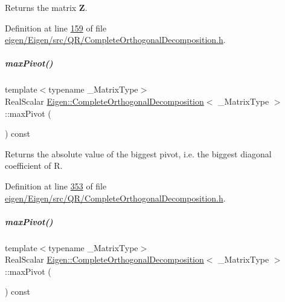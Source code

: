 \begin{DoxyReturn}{Returns}
the matrix {\bfseries Z}. 
\end{DoxyReturn}


Definition at line \hyperlink{eigen_2_eigen_2src_2_q_r_2_complete_orthogonal_decomposition_8h_source_l00159}{159} of file \hyperlink{eigen_2_eigen_2src_2_q_r_2_complete_orthogonal_decomposition_8h_source}{eigen/\+Eigen/src/\+Q\+R/\+Complete\+Orthogonal\+Decomposition.\+h}.

\mbox{\label{group___q_r___module_a5b712a58c13b7e5089be9228ec42f738}} 
\subparagraph{\texorpdfstring{max\+Pivot()}{maxPivot()}\hspace{0.1cm}{\footnotesize\ttfamily [1/2]}}
{\footnotesize\ttfamily template$<$typename \+\_\+\+Matrix\+Type$>$ \\
Real\+Scalar \hyperlink{group___q_r___module_class_eigen_1_1_complete_orthogonal_decomposition}{Eigen\+::\+Complete\+Orthogonal\+Decomposition}$<$ \+\_\+\+Matrix\+Type $>$\+::max\+Pivot (\begin{DoxyParamCaption}{ }\end{DoxyParamCaption}) const\hspace{0.3cm}{\ttfamily [inline]}}

\begin{DoxyReturn}{Returns}
the absolute value of the biggest pivot, i.\+e. the biggest diagonal coefficient of R. 
\end{DoxyReturn}


Definition at line \hyperlink{eigen_2_eigen_2src_2_q_r_2_complete_orthogonal_decomposition_8h_source_l00353}{353} of file \hyperlink{eigen_2_eigen_2src_2_q_r_2_complete_orthogonal_decomposition_8h_source}{eigen/\+Eigen/src/\+Q\+R/\+Complete\+Orthogonal\+Decomposition.\+h}.

\mbox{\label{group___q_r___module_a5b712a58c13b7e5089be9228ec42f738}} 
\subparagraph{\texorpdfstring{max\+Pivot()}{maxPivot()}\hspace{0.1cm}{\footnotesize\ttfamily [2/2]}}
{\footnotesize\ttfamily template$<$typename \+\_\+\+Matrix\+Type$>$ \\
Real\+Scalar \hyperlink{group___q_r___module_class_eigen_1_1_complete_orthogonal_decomposition}{Eigen\+::\+Complete\+Orthogonal\+Decomposition}$<$ \+\_\+\+Matrix\+Type $>$\+::max\+Pivot (\begin{DoxyParamCaption}{ }\end{DoxyParamCaption}) const\hspace{0.3cm}{\ttfamily [inline]}}

